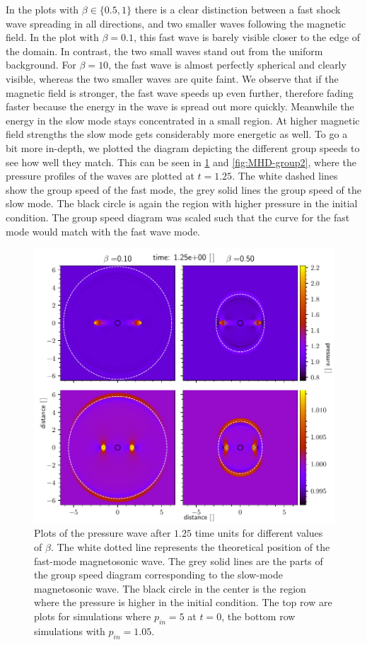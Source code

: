 In the plots with $\beta \in \{0.5,1\}$ there is a clear distinction between a fast shock wave spreading in all directions, and two smaller waves following the magnetic field.
In the plot with $\beta=0.1$, this fast wave is barely visible closer to the edge of the domain. In contrast, the two small waves stand out from the uniform background.
For $\beta=10$, the fast wave is almost perfectly spherical and clearly visible, whereas the two smaller waves are quite faint.
We observe that if the magnetic field is stronger, the fast wave speeds up even further, therefore fading faster because the energy in the wave is spread out more quickly.
Meanwhile the energy in the slow mode stays concentrated in a small region.
At higher magnetic field strengths the slow mode gets considerably more energetic as well.
To go a bit more in-depth, we plotted the diagram depicting the different group speeds to see how well they match. 
This can be seen in \cref{fig:MHD-group1} and \cref{fig:MHD-group2}, where the pressure profiles of the waves are plotted at $t=1.25$.
The white dashed lines show the group speed of the fast mode, the grey solid lines the group speed of the slow mode. 
The black circle is again the region with higher pressure in the initial condition.
The group speed diagram was scaled such that the curve for the fast mode would match with the fast wave mode.

\begin{figure}[H]
	\centering
	\includegraphics[width=\linewidth]{images/group-speed-pressure1.pdf}
	\caption{Plots of the pressure wave after $1.25$ time units for different values of $\beta$. 
	The white dotted line represents the theoretical position of the fast-mode magnetosonic wave.    		The grey solid lines are the parts of the group speed diagram corresponding to the slow-mode magnetosonic wave.
	The black circle in the center is the region where the pressure is higher in the initial condition.
	The top row are plots for simulations where $p_{in}=5$ at $t=0$, the bottom row simulations with $p_{in}=1.05$.}
	\label{fig:MHD-group1}
\end{figure}

